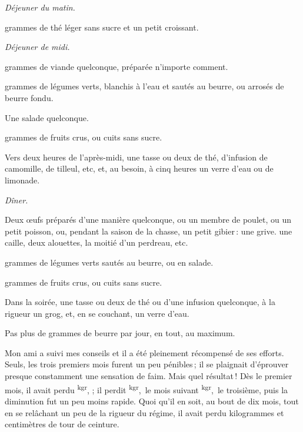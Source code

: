 \medskip

\begin{center}
\textit{Déjeuner du matin.}
\end{center}

\medskip

{\mmm} grammes de thé léger sans sucre et un petit croissant.


\medskip

\begin{center}
\textit{Déjeuner de midi.}
\end{center}

\medskip

{\mmm} grammes de viande quelconque, préparée n'importe comment.

{\mmm} grammes de légumes verts, blanchis à l'eau et sautés au beurre,
ou arrosés de beurre fondu.

Une salade quelconque.

{\mmm} grammes de fruits crus, ou cuits sans sucre.

Vers deux heures de l'après-midi, une tasse ou deux de thé, d'infusion de
camomille, de tilleul, etc, et, au besoin, à cinq heures un verre d'eau ou de
limonade.

\medskip

\begin{center}
\textit{Dîner.}
\end{center}

\medskip

Deux œufs préparés d'une manière quelconque, ou un membre de poulet, ou un
petit poisson, ou, pendant la saison de la chasse, un petit gibier : une grive.
une caille, deux alouettes, la moitié d'un perdreau, etc.

{\mmm} grammes de légumes verts sautés au beurre, ou en salade.

{\mmm} grammes de fruits crus, ou cuits sans sucre.

\medskip

Dans la soirée, une tasse ou deux de thé ou d'une infusion quelconque, à la
rigueur un grog, et, en se couchant, un verre d'eau.

\medskip

Pas plus de {\mmm} grammes de beurre par jour, en tout, au maximum.

\sk

Mon ami a suivi mes conseils et il a été pleinement récompensé de ses efforts.
Seuls, les trois premiers mois furent un peu pénibles ; il se plaignait
d'éprouver presque constamment une sensation de faim. Mais quel résultat ! Dès
le premier mois, il avait perdu
{\mmm}\textsuperscript{kgr}, {\mmm} ; il perdit
{\mmm}\textsuperscript{kgr}, {\mmm} le mois suivant
{\mmm}\textsuperscript{kgr}, {\mmm} le troisième, puis la diminution
fut un peu moins rapide. Quoi qu'il en soit, au bout de dix mois, tout en se
relâchant un peu de la rigueur du régime, il avait perdu {\mmm}
kilogrammes et {\mmm} centimètres de tour de ceinture.

